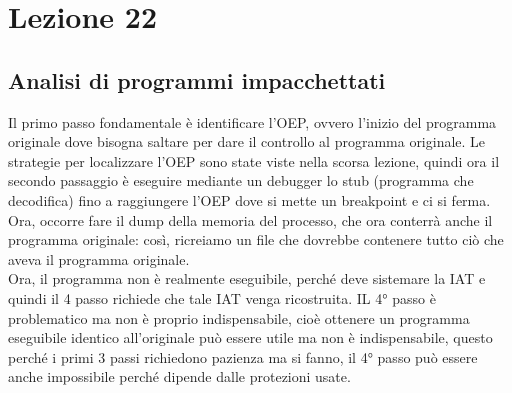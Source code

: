 \documentclass[12pt, oneside]{extbook}
\begin{document}
\chapter{Lezione 22}
\section{Analisi di programmi impacchettati}
Il primo passo fondamentale è identificare l'OEP, ovvero l'inizio del programma originale dove bisogna saltare per dare il controllo al programma originale. Le strategie per localizzare l'OEP sono state viste nella scorsa lezione, quindi ora il secondo passaggio è eseguire mediante un debugger lo stub (programma che decodifica) fino a raggiungere l'OEP dove si mette un breakpoint e ci si ferma.\\Ora, occorre fare il dump della memoria del processo, che ora conterrà anche il programma originale: così, ricreiamo un file che dovrebbe contenere tutto ciò che aveva il programma originale.\\Ora, il programma non è realmente eseguibile, perché deve sistemare la IAT e quindi il 4 passo richiede che tale IAT venga ricostruita. IL 4° passo è problematico ma non è  proprio indispensabile, cioè ottenere un programma eseguibile identico all'originale può essere utile ma non è indispensabile, questo perché i primi 3 passi richiedono pazienza ma si fanno, il 4° passo può essere anche impossibile perché dipende dalle protezioni usate.
\end{document}
